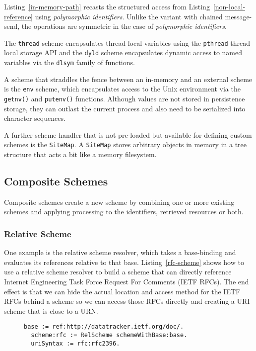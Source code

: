 \documentclass[preprint,authoryear]{acm_proc_article-sp}
\begin{document}
Listing~\ref{in-memory-path} recasts the structured access from 
Listing~\ref{non-local-reference} using \emph{polymorphic identifiers}.  Unlike the variant
with chained message-send, the operations are symmetric in the case of \emph{polymorphic identifiers}.

The {\tt thread} scheme encapsulates thread-local variables using the {\tt pthread} thread
local storage API and the {\tt dyld} scheme encapsulates dynamic access to
named variables via the {\tt dlsym} family of functions.

A scheme that straddles the fence between an in-memory and an external 
scheme is the {\tt env} scheme, which encapsulates access to the Unix
environment via the {\tt getnv()} and {\tt putenv()} functions.  Although 
values are not stored in persistence storage, they can outlast the
current process and also need to be serialized into character sequences.

A further scheme handler that is not pre-loaded but available for defining
custom schemes is the {\tt SiteMap}.  A {\tt SiteMap} stores arbitrary objects
in memory in a tree structure that acts a bit like a memory filesystem.

\subsection{Composite Schemes}

Composite schemes  create a new scheme by combining one or 
more existing schemes and applying processing to the identifiers, retrieved
resources or both.

\subsubsection{Relative Scheme}

One example is the relative scheme resolver, which takes a base-binding
and evaluates its references relative to that base.  Listing~\ref{rfc-scheme} shows
how to use a relative scheme resolver to build a scheme that can directly
reference Internet Engineering Task Force Request For Comments (IETF RFCs).
The end effect is that we can hide the actual location and access method for
the IETF RFCs behind a scheme so we can access those RFCs directly and
creating a URI scheme that is close to a URN.


\begin{figure}[htbp]
\begin{lstlisting}[style=L,label=rfc-scheme,caption=Retrieving RFC 2396 (URI Syntax) via custom rfc: scheme.]
  base := ref:http://datatracker.ietf.org/doc/.
  scheme:rfc := RelScheme schemeWithBase:base.
  uriSyntax := rfc:rfc2396.
\end{lstlisting}
\end{figure}
\end{document}
